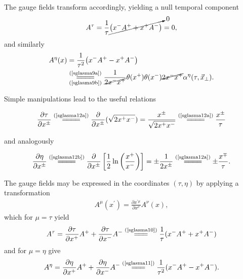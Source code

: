 The gauge fields transform accordingly, yielding a null temporal component
\begin{align*}
    A^\tau=\frac{1}{\tau}\cancelto{0}{\big(x^-A^++x^+A^-\big)}=0,
\end{align*}
and similarly
\begin{align*}
    A^\eta(x)&=\frac{1}{\tau^2}\big(x^-A^+-x^+A^-\big)\\
    &\underset{(\text{\cref{sglasma9b}})}{\stackrel{(\text{\cref{sglasma9a}})}{=\joinrel=\joinrel=\joinrel=}}\frac{1}{\cancel{2x^-x^+}}\theta(x^+)\theta(x^-)\cancel{2x^-x^+}\alpha^\eta(\tau,\vec{x}_\perp).
\end{align*}

\begin{note}
Simple manipulations lead to the useful relations
\begin{fullwidth}
\begin{align}\label{sglasma10}
    \frac{\partial\tau}{\partial x^\pm}\stackrel{(\text{\cref{sglasma12a}})}{=\joinrel=\joinrel=\joinrel=}\frac{\partial}{\partial x^\pm}(\sqrt{2x^+x^-})=\frac{x^\pm}{\sqrt{2x^+x^-}}\stackrel{(\text{\cref{sglasma12a}})}{=\joinrel=\joinrel=\joinrel=}\frac{x^\pm}{\tau}
\end{align}
\end{fullwidth}
and analogously
\begin{fullwidth}
\begin{align}\label{sglasma11}
    \frac{\partial\eta}{\partial x^\pm}\stackrel{(\text{\cref{sglasma12b}})}{=\joinrel=\joinrel=\joinrel=}\frac{\partial}{\partial x^\pm}\left[\frac{1}{2}\ln\left(\frac{x^+}{x^-}\right)\right]=\pm\frac{1}{2x^\pm}\stackrel{(\text{\cref{sglasma12a}})}{=\joinrel=\joinrel=\joinrel=}\pm\frac{x^\mp}{\tau}.
\end{align}
\end{fullwidth}
The gauge fields may be expressed in the coordinates $(\tau,\eta)$ by applying a transformation
\begin{align*}
    A^\mu(x^\prime)=\frac{\partial x^{\prime\mu}}{\partial x^\nu}A^\nu(x),
\end{align*}
which for $\mu=\tau$ yield
\begin{align*}
    A^\tau=\frac{\partial\tau}{\partial x^+}A^++\frac{\partial\tau}{\partial x^-}A^-\stackrel{(\text{\cref{sglasma10}})}{=\joinrel=\joinrel=}\frac{1}{\tau}(x^-A^++x^+A^-)
\end{align*}
and for $\mu=\eta$ give
\begin{align*}
    A^\eta=\frac{\partial\eta}{\partial x^+}A^++\frac{\partial\eta}{\partial x^-}A^-\stackrel{(\text{\cref{sglasma11}})}{=\joinrel=\joinrel=}\frac{1}{\tau^2}(x^-A^+-x^+A^-).
\end{align*}
\end{note}

